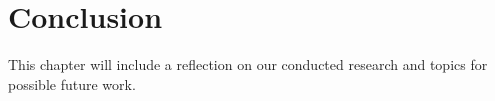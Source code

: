 \chapter{Conclusion}
\label{chapter:conclusion}

This chapter will include a reflection on our conducted research and topics for
possible future work.
